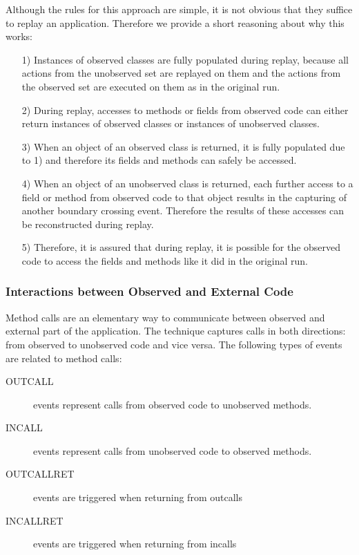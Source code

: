 Although the rules for this approach are simple, it is not obvious that they suffice to replay an application. Therefore we provide a short reasoning about why this works:

\begin{enumerate}
  \item [1)] Instances of observed classes are fully populated during replay, because all actions from the unobserved set are replayed on them and the actions from the observed set are executed on them as in the original run.
  \item [2)] During replay, accesses to methods or fields from observed code can either return instances of observed classes or instances of unobserved classes.
  \item [3)] When an object of an observed class is returned, it is fully populated due to 1) and therefore its fields and methods can safely be accessed.
  \item [4)] When an object of an unobserved class is returned, each further access to a field or method from observed code to that object results in the capturing of another boundary crossing event. Therefore the results of these accesses can be reconstructed during replay.
  \item [5)] Therefore, it is assured that during replay, it is possible for the observed code to access the fields and methods like it did in the original run.
\end{enumerate}



\subsubsection {Interactions between Observed and External Code}
Method calls are an elementary way to communicate between observed and external part of the application. The technique captures calls in both directions: from observed to unobserved code and vice versa. The following types of events are related to method calls:


\begin{description}
 \item  [OUTCALL] events represent calls from observed code to unobserved methods.
 \item [INCALL] events represent calls from unobserved code to observed methods.
 \item [OUTCALLRET] events are triggered when returning from outcalls
 \item [INCALLRET] events are triggered when returning from incalls
\end{description}

